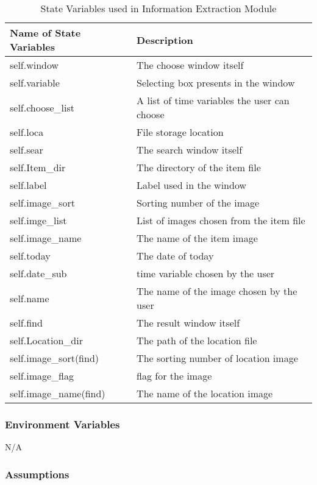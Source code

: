 \documentclass[12pt, titlepage]{article}
\begin{document}
\begin{table}[H]
\caption{State Variables used in Information Extraction Module} 
\begin{tabularx}{\textwidth}{XX}
\toprule
\textbf{Name of State Variables} & \textbf{Description}\\
\midrule
self.window & The choose window itself\\
self.variable & Selecting box presents in the window\\
self.choose\_list & A list of time variables the user can choose\\
self.loca & File storage location\\
self.sear & The search window itself\\
self.Item\_dir & The directory of the item file\\
self.label & Label used in the window\\
self.image\_sort & Sorting number of the image\\
self.imge\_list & List of images chosen from the item file\\
self.image\_name & The name of the item image\\
self.today & The date of today\\
self.date\_sub & time variable chosen by the user\\
self.name & The name of the image chosen by the user\\
self.find & The result window itself\\
self.Location\_dir & The path of the location file\\
self.image\_sort(find) & The sorting number of location image\\
self.image\_flag & flag for the image\\
self.image\_name(find) & The name of the location image\\

\bottomrule
\end{tabularx}
\end{table}

\subsubsection{Environment Variables}

N/A

\subsubsection{Assumptions}
\end{document}

